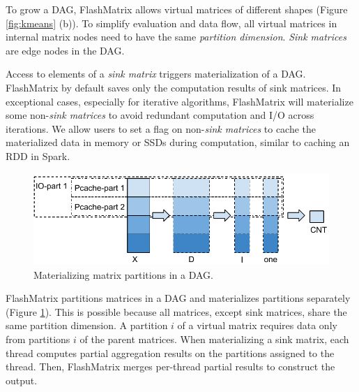 To grow a DAG, FlashMatrix allows virtual matrices of different shapes
(Figure \ref{fig:kmeans} (b)). To simplify evaluation and data flow, 
all virtual matrices in internal matrix nodes need to have the same
\textit{partition dimension}. \textit{Sink matrices} are edge nodes
in the DAG.

Access to elements of a \textit{sink matrix} triggers materialization of a DAG.
FlashMatrix by default saves only the computation results of sink matrices.
In exceptional cases, especially for iterative algorithms,
FlashMatrix will materialize some non-\textit{sink matrices} to avoid
redundant computation and I/O across iterations.  We allow users to
set a flag on non-\textit{sink matrices} to cache the materialized data in memory
or SSDs during computation, similar to caching an RDD in Spark.

\begin{figure}
	\centering
	\includegraphics[scale=0.6]{FlashMatrix_figs/materialize.pdf}
  \vspace{-4pt}
	\caption{Materializing matrix partitions in a DAG.}
	\label{fig:mater}
  \vspace{-8pt}
\end{figure}

FlashMatrix partitions matrices in a DAG and
materializes partitions separately (Figure \ref{fig:mater}). This is possible
because all matrices, except sink matrices, share the same partition dimension. 
A partition $i$ of a virtual matrix requires data only from partitions
$i$ of the parent matrices.
When materializing a sink matrix, each thread computes partial
aggregation results on the partitions assigned to the thread. 
Then, FlashMatrix merges per-thread partial results to construct the output.

